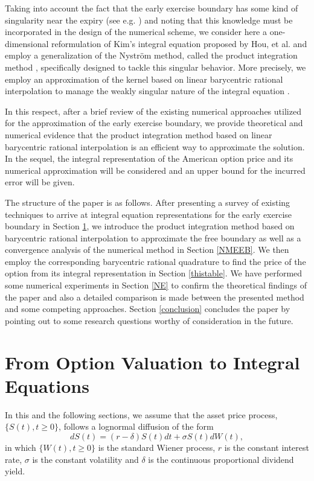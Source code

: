 \documentclass[fleqn,final,3p,11pt]{elsarticle}
\theoremstyle{definition}
\theoremstyle{remark}
\numberwithin{equation}{section}
\begin{document}
Taking into account the fact that the early exercise boundary has some kind of singularity near the expiry (see e.g. \cite{evans, stamicar}) and noting that this knowledge must be incorporated in the design of the numerical scheme, we consider here a one-dimensional reformulation of Kim's integral equation proposed by Hou, et al. \cite{little} and employ a generalization of the Nystr\"{o}m method, called the product integration method \cite{atkinson}, specifically designed to tackle this singular behavior. More precisely, we employ an approximation of the kernel based on linear barycentric rational interpolation to manage the weakly singular nature of the integral equation \cite{cuminato, orsi, hoog}.

In this respect, after a brief review of the existing numerical approaches utilized for the approximation of  the early exercise boundary, we provide  theoretical and numerical evidence that the product integration method based on linear barycentric rational interpolation is an efficient way to approximate the solution. In the sequel, the integral representation of the American option price and its numerical approximation will be considered and an upper bound for the incurred error will be given.


The structure of the paper is as follows. After presenting a survey of existing techniques to arrive at integral equation representations for the early exercise boundary in Section \ref{option}, we introduce the product integration method based on barycentric rational interpolation to approximate the free boundary as well as a convergence analysis of the numerical method in Section \ref{NMEEB}. We then employ the corresponding barycentric rational quadrature to find the price of the option from its integral representation in Section \ref{thistable}. We have performed some numerical experiments in Section \ref{NE} to confirm the theoretical findings of the paper and also a detailed comparison is made between the presented method and some competing approaches. Section \ref{conclusion} concludes the paper by pointing out to some research questions worthy of consideration in the future.

\section{From Option Valuation to Integral Equations}\label{option}
In this and the following sections, we assume that the asset price process, $\{S(t),t\geq 0\}$, follows a lognormal diffusion of the form
 \[dS(t) = (r-\delta)S(t)dt + \sigma S(t)dW(t),\]
in which $\{W(t),t\geq 0\}$ is the standard Wiener process, $r$ is the constant interest rate, $\sigma$ is the constant volatility and $\delta$ is the continuous proportional dividend yield.
\end{document}
